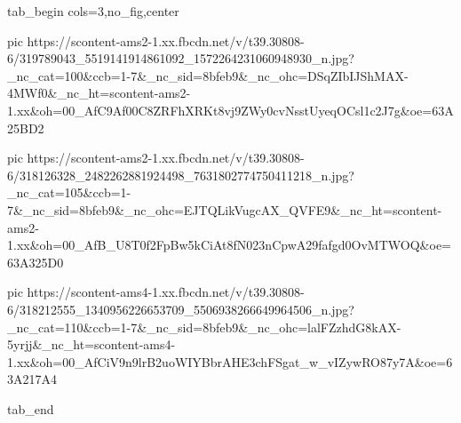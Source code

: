  
 
 
 
 


\ifcmt
  tab_begin cols=3,no_fig,center

     pic https://scontent-ams2-1.xx.fbcdn.net/v/t39.30808-6/319789043_5519141914861092_1572264231060948930_n.jpg?_nc_cat=100&ccb=1-7&_nc_sid=8bfeb9&_nc_ohc=DSqZIbIJShMAX-4MWf0&_nc_ht=scontent-ams2-1.xx&oh=00_AfC9Af00C8ZRFhXRKt8vj9ZWy0cvNsstUyeqOCsl1c2J7g&oe=63A25BD2

     pic https://scontent-ams2-1.xx.fbcdn.net/v/t39.30808-6/318126328_2482262881924498_7631802774750411218_n.jpg?_nc_cat=105&ccb=1-7&_nc_sid=8bfeb9&_nc_ohc=EJTQLikVugcAX_QVFE9&_nc_ht=scontent-ams2-1.xx&oh=00_AfB_U8T0f2FpBw5kCiAt8fN023nCpwA29fafgd0OvMTWOQ&oe=63A325D0

     pic https://scontent-ams4-1.xx.fbcdn.net/v/t39.30808-6/318212555_1340956226653709_5506938266649964506_n.jpg?_nc_cat=110&ccb=1-7&_nc_sid=8bfeb9&_nc_ohc=lalFZzhdG8kAX-5yrjj&_nc_ht=scontent-ams4-1.xx&oh=00_AfCiV9n9lrB2uoWIYBbrAHE3chFSgat_w_vIZywRO87y7A&oe=63A217A4

  tab_end
\fi
